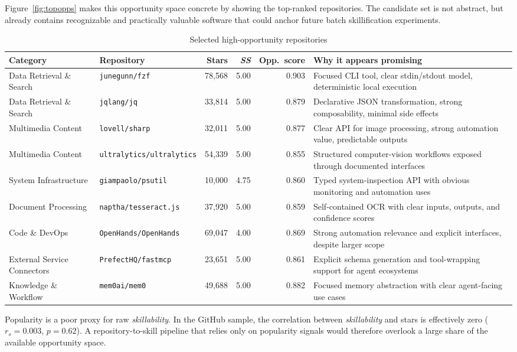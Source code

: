 \documentclass[sigconf,review,anonymous,nonacm]{acmart}
\newcommand{\skillability}{\textit{skillability}\xspace}
\newcommand{\sscore}{\textit{SS}\xspace}
\begin{document}
Figure~\ref{fig:topopps} makes this opportunity space concrete by showing the top-ranked repositories. The candidate set is not abstract, but already contains recognizable and practically valuable software that could anchor future batch skillification experiments.

\begin{table}[t]
\caption{Selected high-opportunity repositories}
\label{tab:toprepos}
\centering
\begin{tabularx}{\textwidth}{lXrrrX}
\toprule
Category & Repository & Stars & \sscore & Opp.\ score & Why it appears promising \\
\midrule
Data Retrieval \& Search & \texttt{junegunn/fzf} & 78,568 & 5.00 & 0.903 & Focused CLI tool, clear stdin/stdout model, deterministic local execution \\
Data Retrieval \& Search & \texttt{jqlang/jq} & 33,814 & 5.00 & 0.879 & Declarative JSON transformation, strong composability, minimal side effects \\
Multimedia Content & \texttt{lovell/sharp} & 32,011 & 5.00 & 0.877 & Clear API for image processing, strong automation value, predictable outputs \\
Multimedia Content & \texttt{ultralytics/ultralytics} & 54,339 & 5.00 & 0.855 & Structured computer-vision workflows exposed through documented interfaces \\
System Infrastructure & \texttt{giampaolo/psutil} & 10,000 & 4.75 & 0.860 & Typed system-inspection API with obvious monitoring and automation uses \\
Document Processing & \texttt{naptha/tesseract.js} & 37,920 & 5.00 & 0.859 & Self-contained OCR with clear inputs, outputs, and confidence scores \\
Code \& DevOps & \texttt{OpenHands/OpenHands} & 69,047 & 4.00 & 0.869 & Strong automation relevance and explicit interfaces, despite larger scope \\
External Service Connectors & \texttt{PrefectHQ/fastmcp} & 23,651 & 5.00 & 0.861 & Explicit schema generation and tool-wrapping support for agent ecosystems \\
Knowledge \& Workflow & \texttt{mem0ai/mem0} & 49,688 & 5.00 & 0.882 & Focused memory abstraction with clear agent-facing use cases \\
\bottomrule
\end{tabularx}
\end{table}

Popularity is a poor proxy for raw \skillability. In the GitHub sample, the correlation between \skillability and stars is effectively zero (\(r_s = 0.003\), \(p = 0.62\)). A repository-to-skill pipeline that relies only on popularity signals would therefore overlook a large share of the available opportunity space.
\end{document}
